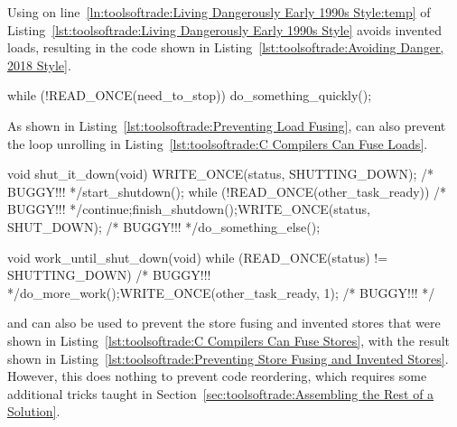 Using  on
line~\ref{ln:toolsoftrade:Living Dangerously Early 1990s Style:temp} of
Listing~\ref{lst:toolsoftrade:Living Dangerously Early 1990s Style}
avoids invented loads,
resulting in the code shown in
Listing~\ref{lst:toolsoftrade:Avoiding Danger, 2018 Style}.

\begin{listing}[tbp]
\begin{fcvlabel}
\begin{VerbatimL}[commandchars=\\\{\}]
while (!READ_ONCE(need_to_stop))
	do_something_quickly();
\end{VerbatimL}
\end{fcvlabel}
\caption{Preventing Load Fusing}
\label{lst:toolsoftrade:Preventing Load Fusing}
\end{listing}

As shown in
Listing~\ref{lst:toolsoftrade:Preventing Load Fusing},
 can also prevent the loop unrolling in
Listing~\ref{lst:toolsoftrade:C Compilers Can Fuse Loads}.

\begin{listing}[tbp]
\begin{fcvlabel}
\begin{VerbatimL}[commandchars=\\\[\]]
void shut_it_down(void)
{
	WRITE_ONCE(status, SHUTTING_DOWN); /* BUGGY!!! */\lnlbl[store:a]
	start_shutdown();
	while (!READ_ONCE(other_task_ready)) /* BUGGY!!! */\lnlbl[loop:b]
		continue;\lnlbl[loop:e]
	finish_shutdown();\lnlbl[finish]
	WRITE_ONCE(status, SHUT_DOWN); /* BUGGY!!! */\lnlbl[store:b]
	do_something_else();
}

void work_until_shut_down(void)
{
	while (READ_ONCE(status) != SHUTTING_DOWN) /* BUGGY!!! */
		do_more_work();
	WRITE_ONCE(other_task_ready, 1); /* BUGGY!!! */
}
\end{VerbatimL}
\end{fcvlabel}
\caption{Preventing Store Fusing and Invented Stores}
\label{lst:toolsoftrade:Preventing Store Fusing and Invented Stores}
\end{listing}

 and  can also be used to prevent the
store fusing and invented stores that were shown in
Listing~\ref{lst:toolsoftrade:C Compilers Can Fuse Stores},
with the result shown in
Listing~\ref{lst:toolsoftrade:Preventing Store Fusing and Invented Stores}.
However, this does nothing to prevent code reordering, which requires
some additional tricks taught in
Section~\ref{sec:toolsoftrade:Assembling the Rest of a Solution}.

